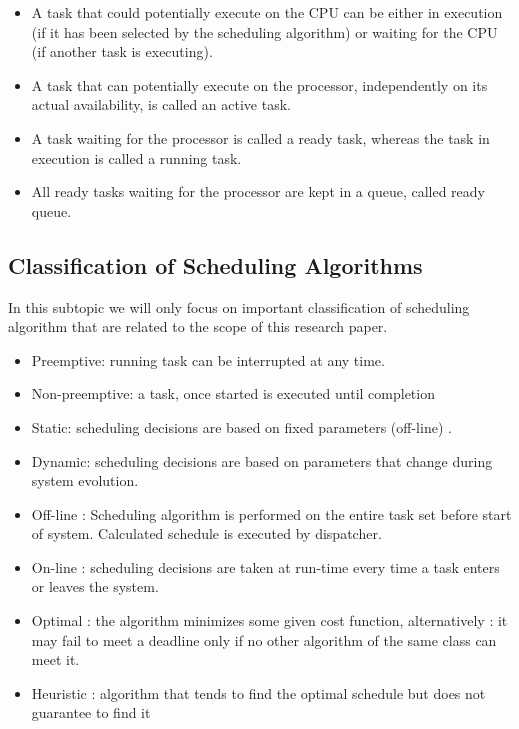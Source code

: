 \begin{itemize}
\item A task that could potentially execute on the CPU can be either in execution (if it has been selected by the scheduling algorithm) or waiting for the CPU (if another task is executing).

\item A task that can potentially execute on the processor, independently on its actual availability, is called an active task.

\item A task waiting for the processor is called a ready task, whereas the task in execution is called a running task.

\item All ready tasks waiting for the processor are kept in a queue, called ready queue.

\end{itemize}

\subsection{Classification of Scheduling Algorithms}

In this subtopic we will only focus on important classification of scheduling algorithm that are related to the scope of this research paper. 

\begin{itemize}
\item Preemptive: running task can be interrupted at any time.
\item Non-preemptive: a task, once started is executed until completion
\item Static: scheduling decisions are based on fixed parameters (off-line) .
\item Dynamic: scheduling decisions are based on parameters that change during system evolution.
\item Off-line : Scheduling algorithm is performed on the entire task set before start of system. Calculated schedule is executed by dispatcher. 
\item On-line : scheduling decisions are taken at run-time every time a task enters or leaves the system.
\item Optimal : the algorithm minimizes some given cost function, alternatively : it may fail to meet a deadline only if no other algorithm of the same class can meet it.
\item Heuristic : algorithm that tends to find the optimal schedule but does not guarantee to find it

\end{itemize}


